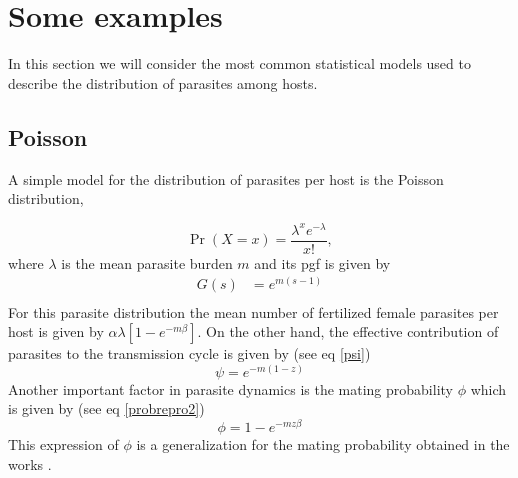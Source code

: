 \documentclass[12pt,a4paper]{article}
\theoremstyle{plain}%
\theoremstyle{definition}
\theoremstyle{remark}
\begin{document}
	
	\section{Some examples}\label{sec:ejemplos}
	In this section we will consider the most common statistical models used to describe the distribution of parasites among hosts.
	\subsection{Poisson}
	A simple model for the distribution of parasites per host \cite{lahmar2001frequency} is the Poisson distribution,
	
	\begin{equation}
	\Pr(X=x)=\frac {\lambda ^{x}e^{-\lambda }}{x!},
	\end{equation}     
	where $\lambda$ is the mean parasite burden $m$ and its pgf is given by
	\begin{equation}
	\begin{split}
	G(s)&=e^{m(s-1)}\\
	\end{split}
	\end{equation}
	For this parasite distribution the 
	mean number of fertilized female parasites per host is given by
	$\alpha \lambda \left[1  -  e^{-m\beta} \right]$.
	On the other hand, the effective contribution of parasites to the transmission cycle is given by (see eq \eqref{psi})
	\begin{equation}
	\psi=e^{-m(1-z)}
	\end{equation}
	Another important factor in parasite dynamics is the mating probability $\phi$ which is given by (see eq \ref{probrepro2})
	\begin{equation}
	\phi=
	1-e^{-mz \beta}
	\end{equation}
	This expression of $\phi$ is a generalization for the  mating probability obtained in the works \cite{anderson1992infectious,may1993biased,may1977togetherness}. 
	
\end{document}
